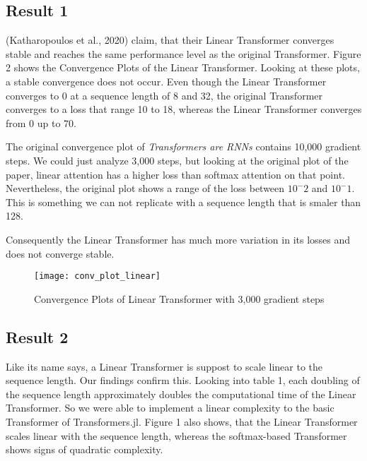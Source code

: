 \documentclass[DIV=13,fontsize=11pt]{scrartcl}
\begin{document}


\subsection{Result 1}
(Katharopoulos et al., 2020) claim, that their Linear Transformer converges stable and reaches the same performance level as the original Transformer.  Figure 2 shows the Convergence Plots of the Linear Transformer. Looking at these plots, a stable convergence does not occur.  Even though the Linear Transformer converges to 0 at a sequence length of 8 and 32, the original Transformer converges to a loss that range 10 to 18, whereas the Linear Transformer converges from 0 up to 70.  

The original convergence plot of  \textit{Transformers are RNNs} contains 10,000 gradient steps. We could just analyze 3,000 steps, but looking at the original plot of the paper, linear attention has a higher loss than softmax attention on that point. Nevertheless, the original plot shows a range of the loss between \(10^-2\) and  \(10^-1\).  This is something we can not replicate with a sequence length that is smaler than 128.

Consequently the Linear Transformer has much more variation in its losses and does not converge stable. 

\begin{figure}[h]
    \centering
    \texttt{[image: conv\_plot\_linear]}
    \caption{Convergence Plots of Linear Transformer with 3,000 gradient steps}
    \label{fig:mesh1}
\end{figure}

\subsection{Result 2}
Like its name says, a Linear Transformer is suppost to scale linear to the sequence length. Our findings confirm this. Looking into table 1, each doubling of the sequence length approximately
doubles the computational time of the Linear Transformer. So we were able to implement a linear complexity to the basic Transformer of Transformers.jl. 
Figure 1 also shows, that the Linear Transformer scales linear with the sequence length, whereas the softmax-based Transformer shows signs of quadratic complexity.
\end{document}
